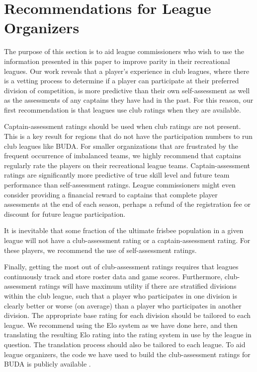 \section{Recommendations for League Organizers}\label{sec:recommendations}

The purpose of this section is to aid league commissioners who wish to use the information presented in this paper to improve parity in their recreational leagues. Our work reveals that a player's experience in club leagues, where there is a vetting process to determine if a player can participate at their preferred division of competition, is more predictive than their own self-assessment as well as the assessments of any captains they have had in the past. For this reason, our first recommendation is that leagues use club ratings when they are available. 

Captain-assessment ratings should be used when club ratings are not present. This is a key result for regions that do not have the participation numbers to run club leagues like BUDA. For smaller organizations that are frustrated by the frequent occurrence of imbalanced teams, we highly recommend that captains regularly rate the players on their recreational league teams. Captain-assessment ratings are significantly more predictive of true skill level and future team performance than self-assessment ratings. League commissioners might even consider providing a financial reward to captains that complete player assessments at the end of each season, perhaps a refund of the registration fee or discount for future league participation. 

It is inevitable that some fraction of the ultimate frisbee population in a given league will not have a club-assessment rating or a captain-assessment rating. For these players, we recommend the use of self-assessment ratings.

Finally, getting the most out of club-assessment ratings requires that leagues continuously track and store roster data and game scores. Furthermore, club-assessment ratings will have maximum utility if there are stratified divisions within the club league, such that a player who participates in one division is clearly better or worse (on average) than a player who participates in another division. The appropriate base rating for each division should be tailored to each league. We recommend using the Elo system as we have done here, and then translating the resulting Elo rating into the rating system in use by the league in question. The translation process should also be tailored to each league. To aid league organizers, the code we have used to build the club-assessment ratings for BUDA is publicly available \cite{shanegit}.